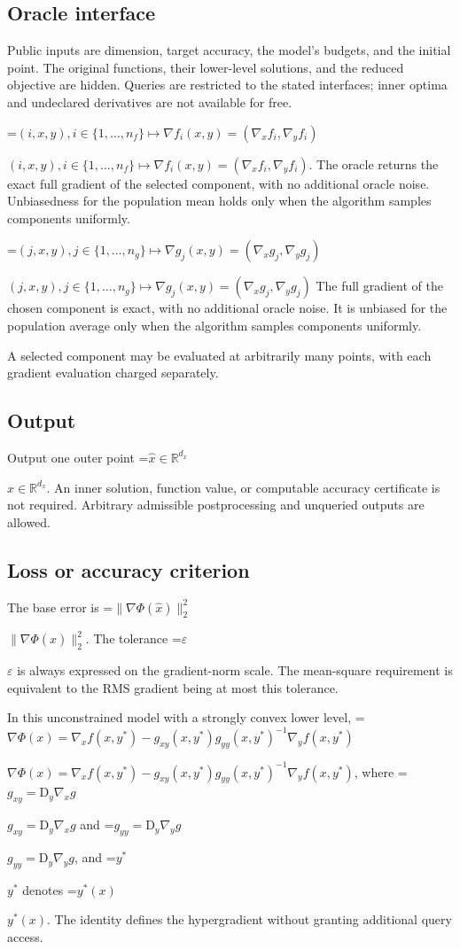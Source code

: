 \documentclass[10pt,a4paper]{article}
\newcommand{\AtlasMath}[1]{\par\begingroup\centering\setbox0=\hbox{$\displaystyle #1$}\ifdim\wd0>1.4\linewidth\typeout{ATLAS WIDE FORMULA: \the\wd0}\fi\ifdim\wd0>\linewidth\resizebox{\linewidth}{!}{\box0}\else\box0\fi\par\endgroup}
\newcommand{\AtlasInlineMath}[1]{\begingroup\setbox0=\hbox{$#1$}\ifdim\wd0>.4\linewidth\endgroup\AtlasMath{#1}\else\endgroup$#1$\fi}
\begin{document}
\subsection{Oracle interface}
Public inputs are dimension, target accuracy, the model's budgets, and the initial point. The original functions, their lower-level solutions, and the reduced objective are hidden. Queries are restricted to the stated interfaces; inner optima and undeclared derivatives are not available for free.

\AtlasInlineMath{(i,x,y), i\in\{1,\ldots,n_f\}\longmapsto \nabla f_i(x,y)=(\nabla _x f_i,\nabla _y f_i)}. The oracle returns the exact full gradient of the selected component, with no additional oracle noise. Unbiasedness for the population mean holds only when the algorithm samples components uniformly.

\AtlasInlineMath{(j,x,y), j\in\{1,\ldots,n_g\}\longmapsto \nabla g_j(x,y)=(\nabla _x g_j,\nabla _y g_j)} The full gradient of the chosen component is exact, with no additional oracle noise. It is unbiased for the population average only when the algorithm samples components uniformly.

A selected component may be evaluated at arbitrarily many points, with each gradient evaluation charged separately.

\subsection{Output}
Output one outer point \AtlasInlineMath{\widehat{x}\in\mathbb{R}^{d_x}}. An inner solution, function value, or computable accuracy certificate is not required. Arbitrary admissible postprocessing and unqueried outputs are allowed.

\subsection{Loss or accuracy criterion}
The base error is \AtlasInlineMath{\|\nabla\Phi(\widehat{x})\|_2^2}. The tolerance \AtlasInlineMath{\varepsilon} is always expressed on the gradient-norm scale. The mean-square requirement is equivalent to the RMS gradient being at most this tolerance.

In this unconstrained model with a strongly convex lower level, \AtlasInlineMath{\nabla\Phi(x)=\nabla_x f(x,y^*)-g_{xy}(x,y^*)g_{yy}(x,y^*)^{-1}\nabla_y f(x,y^*)}, where \AtlasInlineMath{g_{xy}=\mathrm{D}_y\nabla_x g} and \AtlasInlineMath{g_{yy}=\mathrm{D}_y\nabla_y g}, and \AtlasInlineMath{y^*} denotes \AtlasInlineMath{y^*(x)}. The identity defines the hypergradient without granting additional query access.
\end{document}
